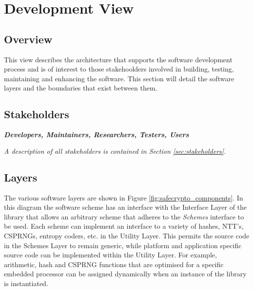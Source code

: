 \section{Development View}
\label{sec_development}

\subsection{Overview}

This view describes the architecture that supports the software development process and is of interest to those stakehoolders involved in building, testing, maintaining and enhancing the software. This section will detail the software layers and the boundaries that exist between them.

\subsection{Stakeholders}

\textbf{\textit{Developers, Maintainers, Researchers, Testers, Users}}

\textit{A description of all stakeholders is contained in Section \ref{sec:stakeholders}.}


\subsection{Layers}

The various software layers are shown in Figure \ref{fig:safecrypto_components}. In this diagram the software scheme has an interface with the Interface Layer of the library that allows an arbitrary scheme that adheres to the \textit{Schemes} interface to be used. Each scheme can implement an interface to a variety of hashes, NTT's, CSPRNGs, entropy coders, etc. in the Utility Layer. This permits the source code in the Schemes Layer to remain generic, while platform and application specific source code can be implemented within the Utility Layer. For example, arithmetic, hash and CSPRNG functions that are optimised for a specific embedded processor can be assigned dynamically when an instance of the library is instantiated.

